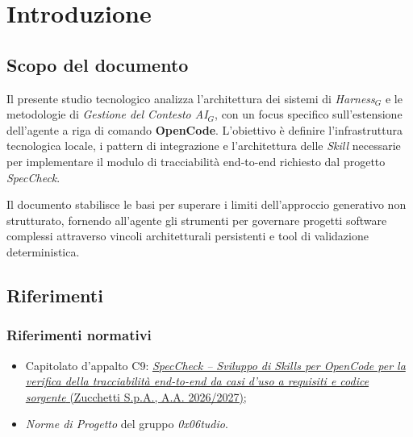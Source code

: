 \documentclass[a4paper, 11pt]{article}
\newcommand{\term}[1]{\textit{#1}$_G$}
\begin{document}
\newpage
\tableofcontents
\newpage

\section{Introduzione}

\subsection{Scopo del documento}
Il presente studio tecnologico analizza l'architettura dei sistemi di \term{Harness} e le metodologie di \term{Gestione del Contesto AI}, con un focus specifico sull'estensione dell'agente a riga di comando \textbf{OpenCode}. L'obiettivo è definire l'infrastruttura tecnologica locale, i pattern di integrazione e l'architettura delle \textit{Skill} necessarie per implementare il modulo di tracciabilità end-to-end richiesto dal progetto \textit{SpecCheck}. 

Il documento stabilisce le basi per superare i limiti dell'approccio generativo non strutturato, fornendo all'agente gli strumenti per governare progetti software complessi attraverso vincoli architetturali persistenti e tool di validazione deterministica.

\subsection{Riferimenti}
\subsubsection{Riferimenti normativi}
\begin{itemize}[noitemsep]
    \item Capitolato d'appalto C9: \href{https://www.math.unipd.it/~tullio/IS-1/2026/Progetto/C9-SpecCheck.pdf}{\textit{SpecCheck -- Sviluppo di Skills per OpenCode per la verifica della tracciabilità end-to-end da casi d'uso a requisiti e codice sorgente} (Zucchetti S.p.A., A.A. 2026/2027)};
    \item \textit{Norme di Progetto} del gruppo \textit{0x06tudio}.
\end{itemize}
\end{document}
